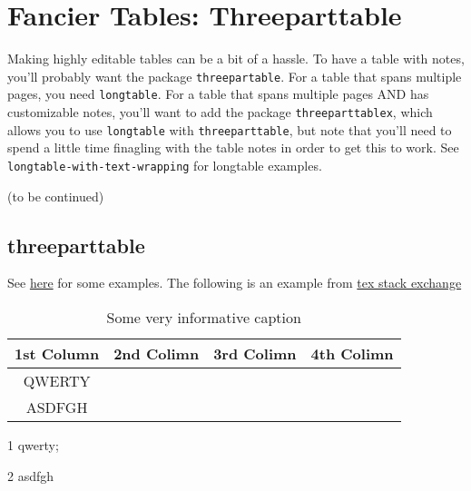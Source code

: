\section{Fancier Tables: Threeparttable}
Making highly editable tables can be a bit of a hassle. To have a table with notes, you'll probably want the package \verb+threepartable+. For a table that spans multiple pages, you need \verb+longtable+. For a table that spans multiple pages AND has customizable notes, you'll want to add the package \verb+threeparttablex+, which allows you to use \verb+longtable+ with \verb+threeparttable+, but note that you'll need to spend a little time finagling with the table notes in order to get this to work. See \verb+longtable-with-text-wrapping+ for longtable examples.

(to be continued)
\subsection{threeparttable}
See \href{https://tug.org/pracjourn/2007-2/asknelly/}{here} for some examples.
The following is an example from \href{https://tex.stackexchange.com/questions/118743/threeparttable-notes-layout}{tex stack exchange}


\begin{table}[htp]
\caption{Some very informative caption}
\begin{center}
\begin{threeparttable}
\begin{tabular}{c c c c}
    \toprule
    \textbf{1st Column} & \textbf{2nd Colimn} & \textbf{3rd Colimn} & \textbf{4th Colimn} \\ \midrule
      QWERTY\tnote{1}   &                     &                     &  \\
      ASDFGH\tnote{2}   &                     &                     &  \\ \bottomrule
\end{tabular}
\begin{tablenotes}
\item[1] qwerty; \item[2] asdfgh
\end{tablenotes}
\end{threeparttable}
\end{center}
\label{table:simDisimCoefNewDef}
\end{table}



